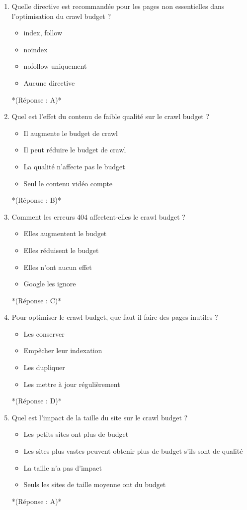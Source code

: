 \documentclass[12pt,a4paper,twoside]{report}
\begin{document}
\begin{enumerate}
\item Quelle directive est recommandée pour les pages non essentielles dans l'optimisation du crawl budget ?
\begin{itemize}
\item[A)] index, follow
\item[B)] noindex
\item[C)] nofollow uniquement
\item[D)] Aucune directive
\end{itemize}
*(Réponse : A)*

\item Quel est l'effet du contenu de faible qualité sur le crawl budget ?
\begin{itemize}
\item[A)] Il augmente le budget de crawl
\item[B)] Il peut réduire le budget de crawl
\item[C)] La qualité n'affecte pas le budget
\item[D)] Seul le contenu vidéo compte
\end{itemize}
*(Réponse : B)*

\item Comment les erreurs 404 affectent-elles le crawl budget ?
\begin{itemize}
\item[A)] Elles augmentent le budget
\item[B)] Elles réduisent le budget
\item[C)] Elles n'ont aucun effet
\item[D)] Google les ignore
\end{itemize}
*(Réponse : C)*

\item Pour optimiser le crawl budget, que faut-il faire des pages inutiles ?
\begin{itemize}
\item[A)] Les conserver
\item[B)] Empêcher leur indexation
\item[C)] Les dupliquer
\item[D)] Les mettre à jour régulièrement
\end{itemize}
*(Réponse : D)*

\item Quel est l'impact de la taille du site sur le crawl budget ?
\begin{itemize}
\item[A)] Les petits sites ont plus de budget
\item[B)] Les sites plus vastes peuvent obtenir plus de budget s'ils sont de qualité
\item[C)] La taille n'a pas d'impact
\item[D)] Seuls les sites de taille moyenne ont du budget
\end{itemize}
*(Réponse : A)*


\end{enumerate}
\end{document}
